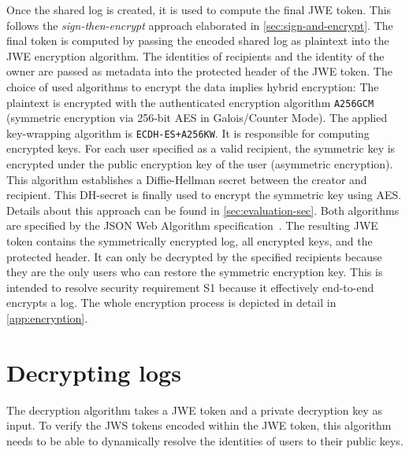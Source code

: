 \documentclass[../main.tex]{subfiles}
\begin{document}
Once the  shared log is created, it is used to compute the final JWE token.
This follows the \emph{sign-then-encrypt} approach elaborated in \cref{sec:sign-and-encrypt}.
The final token is computed by passing the encoded shared log as plaintext into the JWE encryption algorithm.
The identities of recipients and the identity of the owner are passed as metadata into the protected header of the JWE token.
The choice of used algorithms to encrypt the data implies hybrid encryption:
The plaintext is encrypted with the authenticated encryption algorithm \verb|A256GCM| (symmetric encryption via 256-bit AES in Galois/Counter Mode).
The applied key-wrapping algorithm is \verb|ECDH-ES+A256KW|.
It is responsible for computing encrypted keys.
For each user specified as a valid recipient, the symmetric key is encrypted under the public encryption key of the user (asymmetric encryption).
This algorithm establishes a Diffie-Hellman secret between the creator and recipient.
This DH-secret is finally used to encrypt the symmetric key using AES.
Details about this approach can be found in \cref{sec:evaluation-sec}.
Both algorithms are specified by the JSON Web Algorithm specification~\cite{JWA2015}.
The resulting JWE token contains the symmetrically encrypted log, all encrypted keys, and the protected header.
It can only be decrypted by the specified recipients because they are the only users who can restore the symmetric encryption key.
This is intended to resolve security requirement S1 because it effectively end-to-end encrypts a log.
The whole encryption process is depicted in detail in \cref{app:encryption}.

\section{Decrypting logs}\label{sec:decrypting}

The decryption algorithm takes a JWE token and a private decryption key as input.
To verify the JWS tokens encoded within the JWE token, this algorithm needs to be able to dynamically resolve the identities of users to their public keys.
\end{document}
